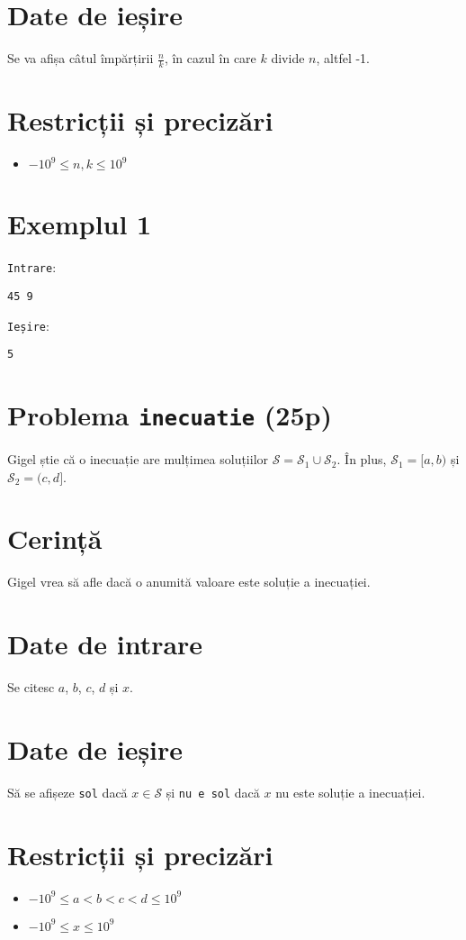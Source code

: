 \documentclass{scrartcl}
\begin{document}
\section*{Date de ieșire}
Se va afișa câtul împărțirii $\frac{n}{k}$, în cazul în care $k$ divide $n$, altfel -1.
\section*{Restricții și precizări}
\begin{itemize}
    \item $-10^9 \leq n, k \leq 10^9$
\end{itemize}

{
\parindent0pt
    
\section*{Exemplul 1}
\texttt{Intrare}:
    \begin{lstlisting}
45 9
    \end{lstlisting}

\texttt{Ieșire}:
    \begin{lstlisting}
5
    \end{lstlisting}

}

\pagebreak

\section*{Problema \texttt{inecuatie} (25p)}
Gigel știe că o inecuație are mulțimea soluțiilor $\mathcal{S} = \mathcal{S}_1 \cup \mathcal{S}_2$.
În plus, $\mathcal{S}_1 = [a, b)$ și $\mathcal{S}_2 = (c, d]$.
\section*{Cerință}
Gigel vrea să afle dacă o anumită valoare este soluție a inecuației.
\section*{Date de intrare}
Se citesc $a$, $b$, $c$, $d$ și $x$. 
\section*{Date de ieșire}
Să se afișeze \texttt{sol} dacă $x \in \mathcal{S}$ și \texttt{nu e sol} dacă $x$
nu este soluție a inecuației.
\section*{Restricții și precizări}
\begin{itemize}
    \item $-10^9 \leq a < b < c < d \leq 10^9$
    \item $-10^9 \leq x \leq 10^9$
\end{itemize}
\end{document}
